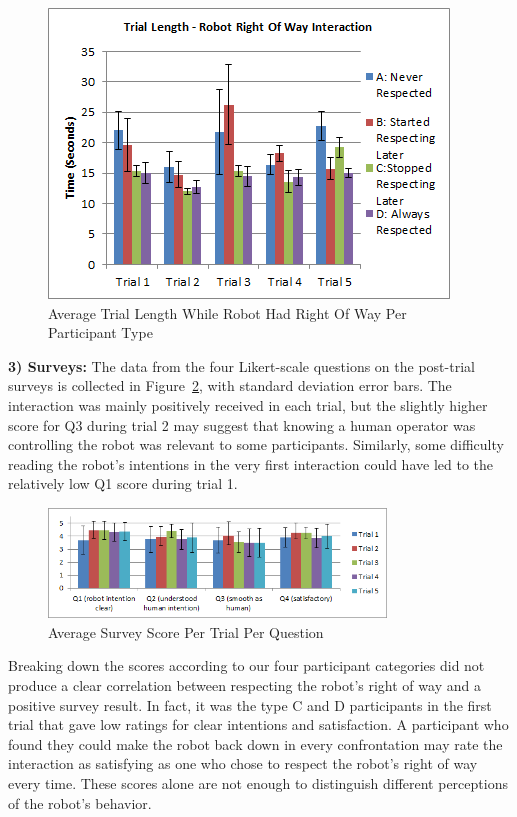 \documentclass[letterpaper, 10 pt, conference]{ieeeconf}  %
\begin{document}
     \begin{figure}
      \centering
      \includegraphics{Robot_right.png}
      \caption{Average Trial Length While Robot Had Right Of Way Per Participant Type}
      \label{fig:Respect}
   \end{figure}

\textbf{3) Surveys:} The data from the four Likert-scale questions on the post-trial surveys is collected in Figure~\ref{fig:Questionnaire}, with standard deviation error bars. The interaction was mainly positively received in each trial, but the slightly higher score for Q3 during trial 2 may suggest that knowing a human operator was controlling the robot was relevant to some participants. Similarly, some difficulty reading the robot's intentions in the very first interaction could have led to the relatively low Q1 score during trial 1.
 
     \begin{figure}
      \centering
      \includegraphics[width=0.8\textwidth]{Questionnaire.png}
      \caption{Average Survey Score Per Trial Per Question }
      \label{fig:Questionnaire}
   \end{figure}
 
Breaking down the scores according to our four participant categories did not produce a clear correlation between respecting the robot's right of way and a positive survey result. In fact, it was the type C and D participants in the first trial that gave low ratings for clear intentions and satisfaction. A participant who found they could make the robot back down in every confrontation may rate the interaction as satisfying as one who chose to respect the robot's right of way every time. These scores alone are not enough to distinguish different perceptions of the robot's behavior.
\end{document}
